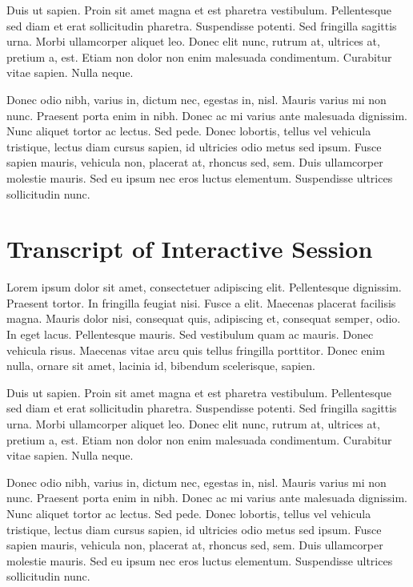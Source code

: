 \documentclass[11pt,letterpaper,onecolumn,twoside,openright,final]{report}
\begin{document}
Duis ut sapien.
Proin sit amet magna et est pharetra vestibulum.
Pellentesque sed diam et erat sollicitudin pharetra.
Suspendisse potenti.
Sed fringilla sagittis urna.
Morbi ullamcorper aliquet leo.
Donec elit nunc, rutrum at, ultrices at, pretium a, est.
Etiam non dolor non enim malesuada condimentum.
Curabitur vitae sapien.
Nulla neque.

Donec odio nibh, varius in, dictum nec, egestas in, nisl.
Mauris varius mi non nunc.
Praesent porta enim in nibh.
Donec ac mi varius ante malesuada dignissim.
Nunc aliquet tortor ac lectus.
Sed pede.
Donec lobortis, tellus vel vehicula tristique, lectus diam cursus sapien, id ultricies odio metus sed ipsum.
Fusce sapien mauris, vehicula non, placerat at, rhoncus sed, sem.
Duis ullamcorper molestie mauris.
Sed eu ipsum nec eros luctus elementum.
Suspendisse ultrices sollicitudin nunc.


\chapter{Transcript of Interactive Session}
Lorem ipsum dolor sit amet, consectetuer adipiscing elit. Pellentesque dignissim.
Praesent tortor.
In fringilla feugiat nisi.
Fusce a elit.
Maecenas placerat facilisis magna.
Mauris dolor nisi, consequat quis, adipiscing et, consequat semper, odio.
In eget lacus.
Pellentesque mauris.
Sed vestibulum quam ac mauris.
Donec vehicula risus.
Maecenas vitae arcu quis tellus fringilla porttitor.
Donec enim nulla, ornare sit amet, lacinia id, bibendum scelerisque, sapien.

Duis ut sapien.
Proin sit amet magna et est pharetra vestibulum.
Pellentesque sed diam et erat sollicitudin pharetra.
Suspendisse potenti.
Sed fringilla sagittis urna.
Morbi ullamcorper aliquet leo.
Donec elit nunc, rutrum at, ultrices at, pretium a, est.
Etiam non dolor non enim malesuada condimentum.
Curabitur vitae sapien.
Nulla neque.

Donec odio nibh, varius in, dictum nec, egestas in, nisl.
Mauris varius mi non nunc.
Praesent porta enim in nibh.
Donec ac mi varius ante malesuada dignissim.
Nunc aliquet tortor ac lectus.
Sed pede.
Donec lobortis, tellus vel vehicula tristique, lectus diam cursus sapien, id ultricies odio metus sed ipsum.
Fusce sapien mauris, vehicula non, placerat at, rhoncus sed, sem.
Duis ullamcorper molestie mauris.
Sed eu ipsum nec eros luctus elementum.
Suspendisse ultrices sollicitudin nunc.




\end{document}
